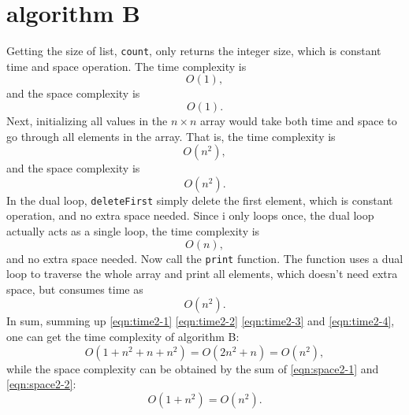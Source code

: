 \documentclass[natbib,12pt]{article}
\begin{document}
\section{algorithm B}
	Getting the size of list, {\tt count}, only returns the integer size, which is constant time and space operation. The time complexity is
	\begin{equation}
		O(1), \label{eqn:time2-1}
	\end{equation}
	and the space complexity is
	\begin{equation}
		O(1). \label{eqn:space2-1}
	\end{equation}
	Next, initializing all values in the $n \times n$ array would take both time and space to go through all elements in the array. That is, the time complexity is
	\begin{equation}
		O(n^2), \label{eqn:time2-2}
	\end{equation}
	and the space complexity is
	\begin{equation}
		O(n^2). \label{eqn:space2-2}
	\end{equation}
	In the dual loop, {\tt deleteFirst} simply delete the first element, which is constant operation, and no extra space needed. Since i only loops once, the dual loop actually acts as a single loop, the time complexity is 
	\begin{equation}
		O(n), \label{eqn:time2-3}
	\end{equation}
	and no extra space needed.
	Now call the {\tt print} function. The function uses a dual loop to traverse the whole array and print all elements, which doesn't need extra space, but consumes time as
	\begin{equation}
		O(n^2). \label{eqn:time2-4}
	\end{equation}
	In sum, summing up \eqref{eqn:time2-1} \eqref{eqn:time2-2} \eqref{eqn:time2-3} and \eqref{eqn:time2-4}, one can get the time complexity of algorithm B:
	\begin{equation}
		O(1 + n^2 + n + n^2) = O(2n^2 + n) = O(n^2),
	\end{equation}
	while the space complexity can be obtained by the sum of \eqref{eqn:space2-1} and \eqref{eqn:space2-2}:
	\begin{equation}
		O(1 + n^2) = O(n^2).
	\end{equation}	
	
\end{document}
